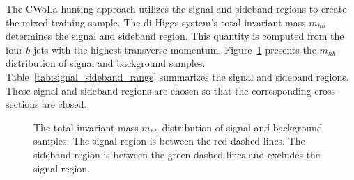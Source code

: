 \documentclass[12pt]{article}
\begin{document}
        The CWoLa hunting approach utilizes the signal and sideband regions to create the mixed training sample. The di-Higgs system's total invariant mass $m_{hh}$ determines the signal and sideband region. This quantity is computed from the four $b$-jets with the highest transverse momentum. Figure~\ref{fig:mhh_distribution} presents the $m_{hh}$ distribution of signal and background samples. Table~\ref{tab:signal_sideband_range} summarizes the signal and sideband regions. These signal and sideband regions are chosen so that the corresponding cross-sections are closed.
        \begin{figure}[htpb]
            \centering
            \caption{The total invariant mass $m_{hh}$ distribution of signal and background samples. The signal region is between the red dashed lines. The sideband region is between the green dashed lines and excludes the signal region.}
            \label{fig:mhh_distribution}
        \end{figure}
\end{document}

